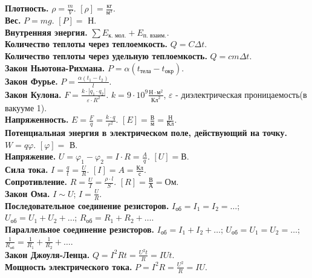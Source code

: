 \documentclass[12pt]{article}
\begin{document}
	\tableofcontents
	\setcounter{tocdepth}{3}
	\newpage
	\noindent
	\textbf{Плотность.} $\rho = \frac{m}{V}$. $[\rho] = \frac{\text{кг}}{\text{м}^3}$. \\
	\textbf{Вес.} $P = mg$. $[P] =$ Н. \\
	\textbf{Внутренняя энергия.} $\sum E_{\text{к. мол.}} + E_{\text{п. взаим.}}$. \\
	\textbf{Количество теплоты через теплоемкость.} $Q = C \varDelta t$. \\
	\textbf{Количество теплоты через удельную теплоемкость.} $Q = c m \varDelta t$. \\
	\textbf{Закон Ньютона-Рихмана.} $P = \alpha (t_{\text{тела}} - t_{\text{окр}})$. \\
	\textbf{Закон Фурье.} $P = \frac{\alpha (t_1 - t_2)}{l}$. \\
	\textbf{Закон Кулона.} $F = \frac{k \cdot |q_{1} \cdot q_{2}|}{\varepsilon \cdot R^{2}}$. $k = 9 \cdot 10^{9} \frac{\text{Н} \cdot \text{м}^{2}}{\text{Кл}^{2}}$, $\varepsilon$ - диэлектрическая проницаемость(в вакууме 1). \\
	\textbf{Напряженность.} $E = \frac{F}{q} = \frac{k \cdot q}{r^{2}}$. $[E] = \frac{\text{В}}{\text{м}} = \frac{\text{Н}}{\text{Кл}}$. \\
	\textbf{Потенциальная энергия в электрическом поле, действующий на точку.} $W = q \varphi$. $[\varphi] =$ В. \\
	\textbf{Напряжение.} $U = \varphi_{1} - \varphi_{2} = I \cdot R = \frac{A}{q}$. $[U] = \text{В}$. \\
	\textbf{Сила тока.} $I = \frac{q}{t} = \frac{U}{R}$. $[I] = A = \frac{\text{Кл}}{\text{с}}$. \\
	\textbf{Сопротивление.} $R = \frac{U}{I} = \frac{\rho \cdot l}{S}$. $[R] = \frac{\text{В}}{\text{А}} = \text{Ом}$. \\
	\textbf{Закон Ома.} $I \sim U$; $I = \frac{U}{R}$. \\
	\textbf{Последовательное соединение резисторов.} $I_{\text{об}} = I_{1} = I_{2} = \dots$; $U_{\text{об}} = U_{1} + U_{2} + \dots$; $R_{\text{об}} = R_{1} + R_{2} + \dots$. \\
	\textbf{Параллельное соединение резисторов.} $I_{\text{об}} = I_{1} + I_{2} + \dots$; $U_{\text{об}} = U_{1} = U_{2} = \dots$; $\frac{1}{R_{\text{об}}} = \frac{1}{R_{1}} + \frac{1}{R_{2}} + \dots$. \\
	\textbf{Закон Джоуля-Ленца.} $Q = I^2Rt = \frac{U^2t}{R} = IUt$. \\
	\textbf{Мощность электрического тока.} $P = I^2R = \frac{U^2}{R} = IU$. \\
\end{document}

